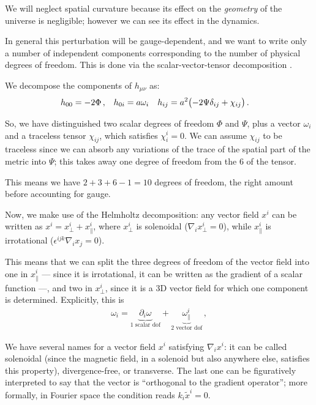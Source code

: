 \documentclass[main.tex]{subfiles}
\begin{document}
We will neglect spatial curvature because its effect on the \emph{geometry} of the universe is negligible; however we can see its effect in the dynamics.

In general this perturbation will be gauge-dependent, and we want to write only a number of independent components corresponding to the number of physical degrees of freedom. This is done via the scalar-vector-tensor decomposition \cite[section 2.1]{bertschingerCosmologicalPerturbationTheory2000a}.

We decompose the components of \(h_{\mu \nu }\) as: 
%
\begin{align}
h_{00} &= -2 \Phi \,, &
h_{0i} &= a \omega_{i} &
h_{ij} &= a^2 \qty(-2 \Psi \delta_{ij} + \chi_{ij})
\,.
\end{align}

So, we have distinguished two scalar degrees of freedom \(\Phi \) and \(\Psi \), plus a vector \(\omega_{i}\) and a traceless tensor \(\chi_{ij}\), which satisfies \(\chi^{i}_{i} = 0 \).
We can assume \(\chi_{ij}\) to be traceless since we can absorb any variations of the trace of the spatial part of the metric into \(\Psi \); this takes away one degree of freedom from the 6 of the tensor. 

This means we have  \(2+ 3 + 6 -1 = 10\) degrees of freedom, the right amount before accounting for gauge. 

Now, we make use of the Helmholtz decomposition: any vector field \(x^{i}\) can be written as \(x^{i} = x^{i}_{\perp} + x^{i}_{\parallel}\), where \(x^{i}_{\perp}\) is solenoidal (\(\nabla_{i} x^{i}_{\perp} = 0\)), while \(x^{i}_{\parallel}\) is irrotational (\(\epsilon^{ijk}\nabla_{i}x_{j} = 0\)). 

This means that we can split the three degrees of freedom of the vector field into one in \(x^{i}_{\parallel}\) --- since it is irrotational, it can be written as the gradient of a scalar function ---, and two in \(x^{i}_{\perp}\), since it is a 3D vector field for which one component is determined. Explicitly, this is 
%
\begin{align}
\omega_{i} = \underbrace{\partial_{i} \omega}_{\text{1 scalar dof}}  + \underbrace{\omega^{i}_{\parallel}}_{\text{2 vector dof}}
\,,
\end{align}
%


We have several names for a vector field \(x^{i}\) satisfying \(\nabla_{i} x^{i}\): it can be called solenoidal (since the magnetic field, in a solenoid but also anywhere else, satisfies this property), divergence-free, or transverse.
The last one can be figuratively interpreted to say that the vector is ``orthogonal to the gradient operator''; more formally, in Fourier space the condition reads \(k_{i} \widetilde{x}^{i} = 0\). 
\end{document}
